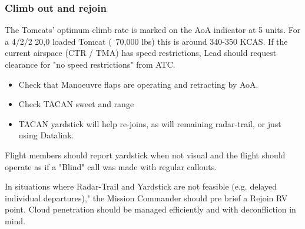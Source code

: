 \newpage

\subsubsection{Climb out and rejoin}

The Tomcats' optimum climb rate is marked on the AoA indicator at 5 units. For
a 4/2/2 20,0 loaded Tomcat (~70,000 lbs) this is around 340-350 KCAS. If the
current airspace (CTR / TMA) has speed restrictions, Lead should request
clearance for "no speed restrictions" from ATC.

\begin{itemize}

  \item Check that Manoeuvre flaps are operating and retracting by AoA.

  \item Check TACAN sweet and range

  \item TACAN yardstick will help re-joins, as will remaining radar-trail, or
    just using Datalink.

\end{itemize}

Flight members should report yardstick when not visual and the flight should
operate as if a "Blind" call was made with regular callouts.

In situations where Radar-Trail and Yardstick are not feasible (e.g. delayed
individual departures)," the Mission Commander should pre brief a Rejoin RV
point. Cloud penetration should be managed efficiently and with deconfliction
in mind.
